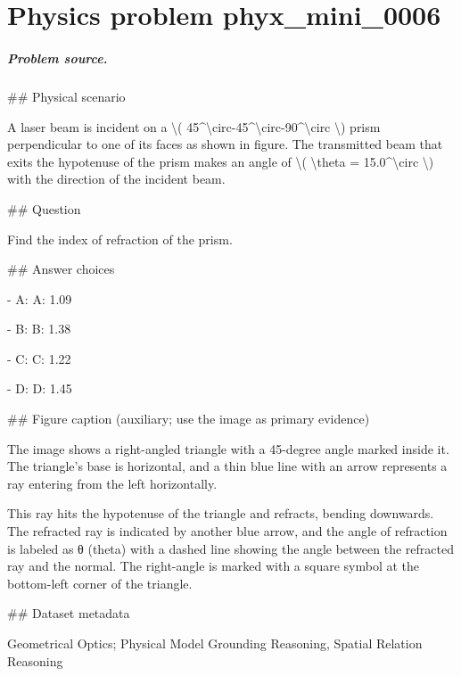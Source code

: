 
\chapter{Physics problem phyx\_mini\_0006}
\label{ch:PhyXMiniProblems_problem_phyx_mini_0006}

\paragraph{Problem source.}
\#\# Physical scenario

A laser beam is incident on a \textbackslash{}( 45\textasciicircum{}\textbackslash{}circ-45\textasciicircum{}\textbackslash{}circ-90\textasciicircum{}\textbackslash{}circ \textbackslash{}) prism perpendicular to one of its faces as shown in figure. The transmitted beam that exits the hypotenuse of the prism makes an angle of \textbackslash{}( \textbackslash{}theta = 15.0\textasciicircum{}\textbackslash{}circ \textbackslash{}) with the direction of the incident beam.

\#\# Question

Find the index of refraction of the prism.

\#\# Answer choices

- A: A: 1.09

- B: B: 1.38

- C: C: 1.22

- D: D: 1.45

\#\# Figure caption (auxiliary; use the image as primary evidence)

The image shows a right-angled triangle with a 45-degree angle marked inside it. The triangle's base is horizontal, and a thin blue line with an arrow represents a ray entering from the left horizontally. 

This ray hits the hypotenuse of the triangle and refracts, bending downwards. The refracted ray is indicated by another blue arrow, and the angle of refraction is labeled as θ (theta) with a dashed line showing the angle between the refracted ray and the normal. The right-angle is marked with a square symbol at the bottom-left corner of the triangle.

\#\# Dataset metadata

Geometrical Optics; Physical Model Grounding Reasoning, Spatial Relation Reasoning

